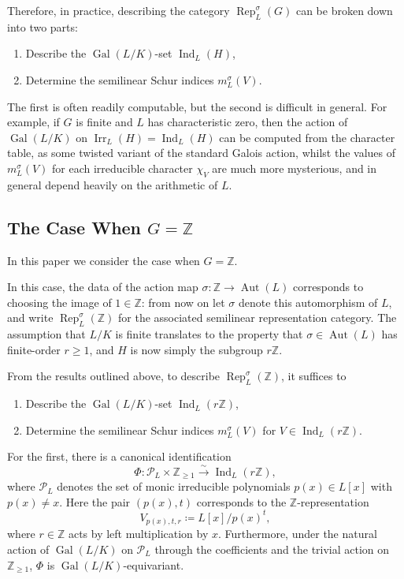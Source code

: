 \documentclass[10pt, reqno, hidelinks]{amsart}
\DeclareMathOperator{\Gal}{Gal}
\DeclareMathOperator{\Rep}{Rep}
\DeclareMathOperator{\Ind}{Ind}
\DeclareMathOperator{\Irr}{Irr}
\DeclareMathOperator{\Aut}{Aut}
\newcommand{\bZ}{{\mathbb Z}}
\newcommand{\sP}{{\mathcal P}}
\numberwithin{thm}{subsection}
\theoremstyle{definition}
\begin{document}
Therefore, in practice, describing the category $\Rep_L^{\sigma}(G)$ can be broken down into two parts:
\begin{enumerate}
	\item Describe the $\Gal(L/K)$-set $\Ind_L(H)$,
	\item Determine the semilinear Schur indices $m_L^{\sigma}(V)$.
\end{enumerate}

The first is often readily computable, but the second is difficult in general. For example, if $G$ is finite and $L$ has characteristic zero, then the action of $\Gal(L/K)$ on $\Irr_L(H) = \Ind_L(H)$ can be computed from the character table, as some twisted variant of the standard Galois action, whilst the values of $m_L^{\sigma}(V)$ for each irreducible character $\chi_V$ are much more mysterious, and in general depend heavily on the arithmetic of $L$.

\subsection*{The Case When $G = \bZ$}
In this paper we consider the case when $G = \bZ$.

In this case, the data of the action map $\sigma \colon \bZ \rightarrow \Aut(L)$ corresponds to choosing the image of $1 \in \bZ$: from now on let $\sigma$ denote this automorphism of $L$, and write $\Rep_L^{\sigma}(\bZ)$ for the associated semilinear representation category. The assumption that $L /K$ is finite translates to the property that $\sigma \in \Aut(L)$ has finite-order $r \geq 1$, and $H$ is now simply the subgroup $r \bZ$.

From the results outlined above, to describe $\Rep_L^{\sigma}(\bZ)$, it suffices to
\begin{enumerate}
	\item Describe the $\Gal(L/K)$-set $\Ind_L(r\bZ)$,
	\item Determine the semilinear Schur indices $m_L^{\sigma}(V)$ for $V \in \Ind_L(r\bZ)$.
\end{enumerate}

For the first, there is a canonical identification
\[
	\Phi \colon \sP_L \times \bZ_{\geq 1} \xrightarrow{\sim} \Ind_L(r\bZ),
\]
where $\sP_L$ denotes the set of monic irreducible polynomials $p(x) \in L[x]$ with $p(x) \neq x$. Here the pair $(p(x),t)$ corresponds to the $\bZ$-representation
\[
V_{p(x), t, r} \coloneqq L[x] / p(x)^t,
\]
where $r \in \bZ$ acts by left multiplication by $x$. Furthermore, under the natural action of $\Gal(L/K)$ on $\sP_L$ through the coefficients and the trivial action on $\bZ_{\geq 1}$, $\Phi$ is $\Gal(L/K)$-equivariant.
\end{document}

